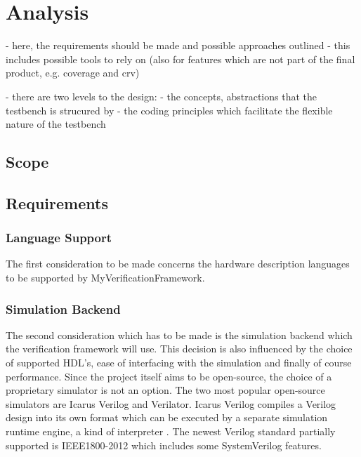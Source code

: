 \documentclass[11pt]{report}
\newcommand{\name}{MyVerificationFramework}
\begin{document}
\chapter{Analysis} %

- here, the requirements should be made and possible approaches outlined
- this includes possible tools to rely on (also for features which are not part of the final product, e.g. coverage and crv)

- there are two levels to the design:
- the concepts, abstractions that the testbench is strucured by
- the coding principles which facilitate the flexible nature of the testbench

\section{Scope} %

\section{Requirements} %

\subsection{Language Support} %
The first consideration to be made concerns the hardware description languages to be supported by \name.

\subsection{Simulation Backend} %
The second consideration which has to be made is the simulation backend which the verification framework will use.
This decision is also influenced by the choice of supported HDL's, ease of interfacing with the simulation and
finally of course performance. Since the project itself aims to be open-source, the choice of a proprietary simulator
is not an option. The two most popular open-source simulators are Icarus Verilog and Verilator. Icarus Verilog
compiles a Verilog design into its own format which can be executed by a separate simulation runtime engine, a kind
of interpreter \cite{iverilog}. The newest Verilog standard partially supported is IEEE1800-2012 which includes some
SystemVerilog features.
\end{document}
